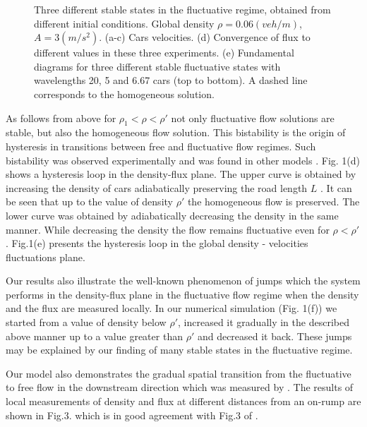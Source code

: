 \begin{figure*}
\label{2}

\centerline{
}
\vskip 0.3cm
\caption{ Three different stable states in the fluctuative regime, obtained
from different initial conditions. Global density $\rho=0.06(veh/m)$,
$A=3(m/s^2)$. (a-c) Cars velocities. (d) Convergence of
flux to different values in these three experiments. (e) Fundamental diagrams
for three different stable fluctuative states with wavelengths 20, 5 and 6.67
cars (top to bottom). A dashed line corresponds to the homogeneous solution.}

\end{figure*}


As follows from above for
$\rho_1<\rho<\rho'$ not only fluctuative flow solutions are stable, but also
the homogeneous flow solution. This bistability is the origin of
hysteresis in transitions between free and fluctuative flow regimes.
Such  bistability was observed experimentally \cite{KR1} and was found in 
other models \cite{Sug,PN,LLK}. Fig. 1(d) shows a hysteresis
loop in the density-flux plane. The upper curve is obtained by
increasing the density of cars adiabatically preserving the road
length $L$ \cite{insert}. It can be seen that up to the value of density
$\rho'$ the homogeneous flow is preserved. The lower
curve was obtained by adiabatically decreasing the density in the same manner.
While decreasing the density the flow remains fluctuative even for
$\rho<\rho'$. Fig.1(e) presents the hysteresis loop in the global density -
velocities fluctuations plane. 

Our results also illustrate the well-known phenomenon
\cite{KR1,KR2,Sug,LLK,Nagel} of jumps which the system performs in the
density-flux plane in the fluctuative flow regime when the density and the
flux are measured locally. In our numerical simulation (Fig. 1(f)) we started
from a value of density below $\rho'$, increased it gradually in the described
above manner up to a value greater than $\rho'$ and decreased it back.
These jumps may be explained by our finding of many stable states in the
fluctuative regime. 


Our model also demonstrates the gradual spatial transition from the fluctuative
to free flow in the downstream direction which was measured by \cite{KR1}.  
The results of local measurements of density and flux at different distances
from an on-rump \cite{onrump} are shown in Fig.3. which is in good agreement
with Fig.3 of \cite{KR1}.  


